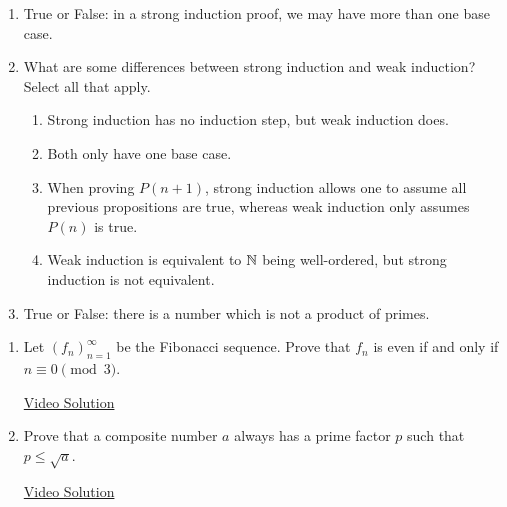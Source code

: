 \pagestyle{empty}


\begin{enumerate}
	\item True or False: in a strong induction proof, we may have more than one base case.

	\item What are some differences between strong induction and weak induction? Select all that apply.
	\begin{enumerate}
    \item Strong induction has no induction step, but weak induction does.
    \item Both only have one base case.
    \item When proving $P(n+1)$, strong induction allows one to assume all previous propositions are true, whereas weak induction only assumes $P(n)$ is true.
    \item Weak induction is equivalent to $\mathbb{N}$ being well-ordered, but strong induction is not equivalent.
	\end{enumerate}

	\item True or False: there is a number which is not a product of primes.
\end{enumerate}



\begin{enumerate}
	\item Let $(f_n)_{n=1}^\infty$ be the Fibonacci sequence. Prove that $f_n$ is even if and only if $n\equiv 0 \pmod 3$.
	
	\href{https://youtu.be/QqCvIcfTwDo}{Video Solution}
	
	\item Prove that a composite number $a$ always has a prime factor $p$ such that $p\le\sqrt{a}$.
	
	\href{https://youtu.be/csZ-xYraPL0}{Video Solution}
\end{enumerate}

